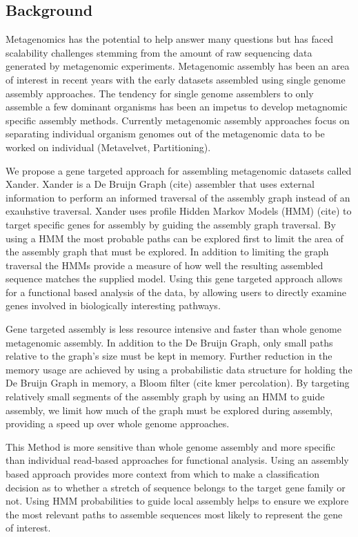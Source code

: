 \documentclass[10pt]{bmc_article}
\newenvironment{bmcformat}{\begin{raggedright}\baselineskip20pt\sloppy\setboolean{publ}{false}}{\end{raggedright}\baselineskip20pt\sloppy}
\begin{document}
\begin{bmcformat}
\section*{Background}
Metagenomics has the potential to help answer many questions but has faced scalability challenges stemming from the amount of raw sequencing data generated by metagenomic experiments.  Metagenomic assembly has been an area of interest in recent years with the early datasets assembled using single genome assembly approaches.  The tendency for single genome assemblers to only assemble a few dominant organisms has been an impetus to develop metagnomic specific assembly methods.  Currently metagenomic assembly approaches focus on separating individual organism genomes out of the metagenomic data to be worked on individual (Metavelvet, Partitioning).  

We propose a gene targeted approach for assembling metagenomic datasets called Xander.  Xander is a De Bruijn Graph (cite) assembler that uses external information to perform an informed traversal of the assembly graph instead of an exauhstive traversal.  Xander uses profile Hidden Markov Models (HMM) (cite) to target specific genes for assembly by guiding the assembly graph traversal. By using a HMM the most probable paths can be explored first to limit the area of the assembly graph that must be explored.  In addition to limiting the graph traversal the HMMs provide a measure of how well the resulting assembled sequence matches the supplied model.  Using this gene targeted approach allows for a functional based analysis of the data, by allowing users to directly examine genes involved in biologically interesting pathways.

Gene targeted assembly is less resource intensive and faster than whole genome metagenomic assembly.  In addition to the De Bruijn Graph, only small paths relative to the graph's size must be kept in memory.  Further reduction in the memory usage are achieved by using a probabilistic data structure for holding the De Bruijn Graph in memory, a Bloom filter \cite{Bloom1970} (cite kmer percolation).  By targeting relatively small segments of the assembly graph by using an HMM to guide assembly, we limit how much of the graph must be explored during assembly, providing a speed up over whole genome approaches.

This Method is more sensitive than whole genome assembly and more specific than individual read-based approaches for functional analysis.  Using an assembly based approach provides more context from which to make a classification decision as to whether a stretch of sequence belongs to the target gene family or not.  Using HMM probabilities to guide local assembly helps to ensure we explore the most relevant paths to assemble sequences most likely to represent the gene of interest.


\end{bmcformat}
\end{document}
